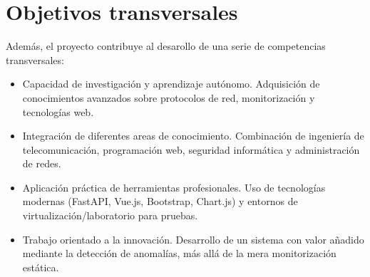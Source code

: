 \section{Objetivos transversales}

Además, el proyecto contribuye al desarollo de una serie de competencias transversales:

\begin{itemize}
  \item Capacidad de investigación y aprendizaje autónomo. Adquisición de conocimientos avanzados sobre protocolos de red, monitorización y tecnologías web.
  \item Integración de diferentes areas de conocimiento. Combinación de ingeniería de telecomunicación, programación web, seguridad informática y administración de redes.
  \item Aplicación práctica de herramientas profesionales. Uso de tecnologías modernas (FastAPI, Vue.js, Bootstrap, Chart.js) y entornos de virtualización/laboratorio para pruebas.
  \item Trabajo orientado a la innovación. Desarrollo de un sistema con valor añadido mediante la detección de anomalías, más allá de la mera monitorización estática.
\end{itemize}  